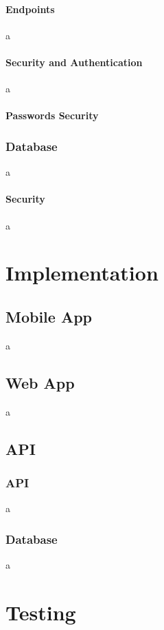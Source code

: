 \documentclass[11pt,openright,a4paper]{report}
\begin{document}
\newpage
\subsubsection{Endpoints}
a

\subsubsection{Security and Authentication} \label{sec:apiauth}
a

\subsubsection{Passwords Security}

\subsection{Database}
a

\subsubsection{Security}
a

\chapter{Implementation}
\section{Mobile App}
a

\section{Web App}
a

\section{API}
\subsection{API}
a

\subsection{Database}
a

\chapter{Testing}
\end{document}
